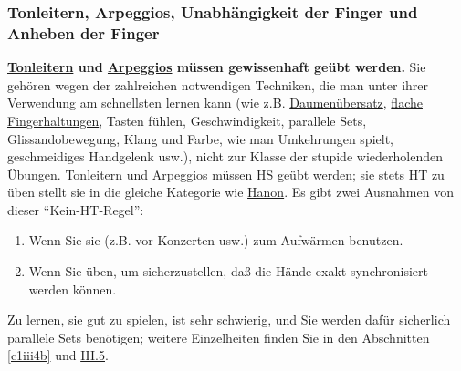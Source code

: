 
\subsubsection{Tonleitern, Arpeggios, Unabhängigkeit der Finger und Anheben der Finger}
\label{c1iii7d}

\textbf{\hyperref[c1iii5a]{Tonleitern} und \hyperref[Arpeggios]{Arpeggios} müssen gewissenhaft geübt werden.}
Sie gehören wegen der zahlreichen notwendigen Techniken, die man unter ihrer Verwendung am schnellsten lernen kann (wie z.B. \hyperref[c1iii5a]{Daumenübersatz}, \hyperref[c1iii4b]{flache Fingerhaltungen}, Tasten fühlen, Geschwindigkeit, parallele Sets, Glissandobewegung, Klang und Farbe, wie man Umkehrungen spielt, geschmeidiges Handgelenk usw.), nicht zur Klasse der stupide wiederholenden Übungen.
Tonleitern und Arpeggios müssen HS geübt werden; sie stets HT zu üben stellt sie in die gleiche Kategorie wie \hyperref[c1iii7h]{Hanon}.
Es gibt zwei Ausnahmen von dieser \enquote{Kein-HT-Regel}:

\begin{enumerate} 
 \item Wenn Sie sie (z.B. vor Konzerten usw.) zum Aufwärmen benutzen.
 \item Wenn Sie üben, um sicherzustellen, daß die Hände exakt synchronisiert werden können.
\end{enumerate}
Zu lernen, sie gut zu spielen, ist sehr schwierig, und Sie werden dafür sicherlich parallele Sets benötigen; weitere Einzelheiten finden Sie in den Abschnitten \hyperref[c1iii4b]{\autoref{c1iii4b}} und \hyperref[c1iii5a]{III.5}.


\label{c1iii7finger}

